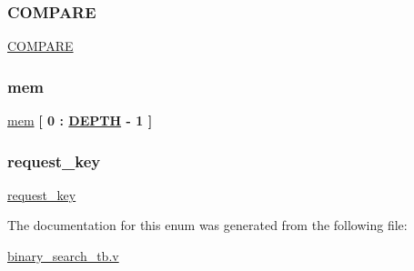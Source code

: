 \subsubsection{\texorpdfstring{C\+O\+M\+P\+A\+RE}{COMPARE}}
{\footnotesize\ttfamily \mbox{\hyperlink{enumbinary__search__tb_a3bdf46b2b8703a5293bb1322d4802039}{C\+O\+M\+P\+A\+RE}} {\bfseries \textcolor{vhdlchar}{ }} \hspace{0.3cm}}

\mbox{\label{enumbinary__search__tb_a1f84d0ccad171ddd61f482601523e35b}} 
\subsubsection{\texorpdfstring{mem}{mem}}
{\footnotesize\ttfamily \mbox{\hyperlink{enumbinary__search__tb_a1f84d0ccad171ddd61f482601523e35b}{mem}} {\bfseries \textcolor{vhdlchar}{\mbox{[}}\textcolor{vhdlchar}{ } \textcolor{vhdldigit}{0} \textcolor{vhdlchar}{ }\textcolor{vhdlchar}{\+:}\textcolor{vhdlchar}{ }{\bfseries \mbox{\hyperlink{enumbinary__search__tb_a966aad5e0c678340650456fee3ae4392}{D\+E\+P\+TH}}} \textcolor{vhdlchar}{-\/} \textcolor{vhdldigit}{1} \textcolor{vhdlchar}{ }\textcolor{vhdlchar}{\mbox{]}}\textcolor{vhdlchar}{ }} \hspace{0.3cm}}

\mbox{\label{enumbinary__search__tb_a55f9f2f8be34929a07a9cbd51b0077ef}} 
\subsubsection{\texorpdfstring{request\+\_\+key}{request\_key}}
{\footnotesize\ttfamily \mbox{\hyperlink{enumbinary__search__tb_a55f9f2f8be34929a07a9cbd51b0077ef}{request\+\_\+key}} {\bfseries \textcolor{vhdlchar}{ }} \hspace{0.3cm}}



The documentation for this enum was generated from the following file\+:\begin{DoxyCompactItemize}
\item 
\mbox{\hyperlink{binary__search__tb_8v}{binary\+\_\+search\+\_\+tb.\+v}}\end{DoxyCompactItemize}
